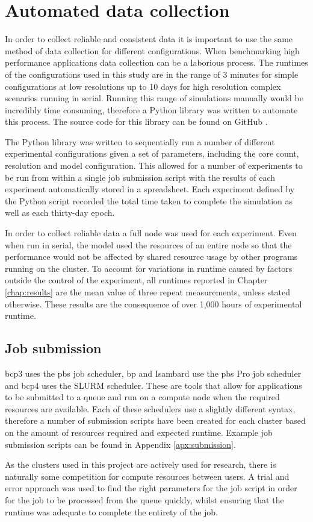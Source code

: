 \documentclass[a4paper,11pt]{report}
\begin{document}
\section{Automated data collection}
In order to collect reliable and consistent data it is important to use the same method of data collection for different configurations. When benchmarking high performance applications data collection can be a laborious process. The runtimes of the configurations used in this study are in the range of 3 minutes for simple configurations at low resolutions up to 10 days for high resolution complex scenarios running in serial. Running this range of simulations manually would be incredibly time consuming, therefore a Python library was written to automate this process. The source code for this library can be found on GitHub \cite{lancaster2019github}. 
\par
The Python library was written to sequentially run a number of different experimental configurations given a set of parameters, including the core count, resolution and model configuration. This allowed for a number of experiments to be run from within a single job submission script with the results of each experiment automatically stored in a spreadsheet. Each experiment defined by the Python script recorded the total time taken to complete the simulation as well as each thirty-day epoch.
\par
In order to collect reliable data a full node was used for each experiment. Even when run in serial, the model used the resources of an entire node so that the performance would not be affected by shared resource usage by other programs running on the cluster. To account for variations in runtime caused by factors outside the control of the experiment, all runtimes reported in Chapter \ref{chap:results} are the mean value of three repeat measurements, unless stated otherwise. These results are the consequence of over 1,000 hours of experimental runtime. 


\subsection{Job submission}
\gls{bcp3} uses the \gls{pbs} job scheduler, \gls{bp} and Isambard use the \gls{pbs} Pro job scheduler and \gls{bcp4} uses the SLURM scheduler. These are tools that allow for applications to be submitted to a queue and run on a compute node when the required resources are available. Each of these schedulers use a slightly different syntax, therefore a number of submission scripts have been created for each cluster based on the amount of resources required and expected runtime. Example job submission scripts can be found in Appendix \ref{apx:submission}. 
\par
As the clusters used in this project are actively used for research, there is naturally some competition for compute resources between users. A trial and error approach was used to find the right parameters for the job script in order for the job to be processed from the queue quickly, whilst ensuring that the runtime was adequate to complete the entirety of the job.
\end{document}
